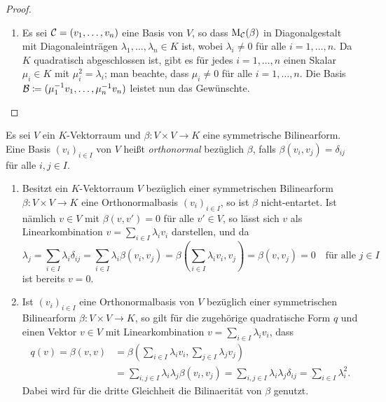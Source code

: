 \documentclass[a4paper,10pt,numbers=noenddot]{scrartcl}
\begin{document}
\begin{proof}
\begin{enumerate}[leftmargin=*]
    \item
      Es sei $\mathcal{C} = (v_1, \dotsc, v_n)$ eine Basis von $V$, so dass $\operatorname{M}_{\mathcal{C}}(\beta)$ in Diagonalgestalt mit Diagonaleinträgen $\lambda_1, \dotsc, \lambda_n \in K$ ist, wobei $\lambda_i \neq 0$ für alle $i = 1, \dotsc, n$.
      Da $K$ quadratisch abgeschlossen ist, gibt es für jedes $i = 1, \dotsc, n$ einen Skalar $\mu_i \in K$ mit $\mu_i^2 = \lambda_i$; man beachte, dass $\mu_i \neq 0$ für alle $i = 1, \dotsc, n$.
      Die Basis $\mathcal{B} \coloneqq (\mu_1^{-1} v_1, \dotsc, \mu_n^{-1} v_n)$ leistet nun das Gewünschte.
    \qedhere
  \end{enumerate}
\end{proof}


\begin{definition}
  Es sei $V$ ein $K$-Vektorraum und $\beta \colon V \times V \to K$ eine symmetrische Bilinearform.
  Eine Basis $(v_i)_{i \in I}$ von $V$ heißt \emph{orthonormal} bezüglich $\beta$, falls $\beta(v_i, v_j) = \delta_{ij}$ für alle $i,j \in I$.
\end{definition}


\begin{remark}
  \begin{enumerate}[leftmargin=*]
    \item
      Besitzt ein $K$-Vektorraum $V$ bezüglich einer symmetrischen Bilinearform $\beta \colon V \times V \to K$ eine Orthonormalbasis $(v_i)_{i \in I}$, so ist $\beta$ nicht-entartet.
      Ist nämlich $v \in V$ mit $\beta(v, v') = 0$ für alle $v' \in V$, so lässt sich $v$ als Linearkombination $v = \sum_{i \in I} \lambda_i v_i$ darstellen, und da
      \[
          \lambda_j
        = \sum_{i \in I} \lambda_i \delta_{ij}
        = \sum_{i \in I} \lambda_i \beta(v_i, v_j)
        = \beta\left( \sum_{i \in I} \lambda_i v_i, v_j \right)
        = \beta(v, v_j)
        = 0
        \quad
        \text{für alle $j \in I$}
      \]
      ist bereits $v = 0$.
    \item
      Ist $(v_i)_{i \in I}$ eine Orthonormalbasis von $V$ bezüglich einer symmetrischen Bilinearform $\beta \colon V \times V \to K$, so gilt für die zugehörige quadratische Form $q$ und einen Vektor $v \in V$ mit Linearkombination $v = \sum_{i \in I} \lambda_i v_i$, dass
      \begin{align*}
            q(v)
         =  \beta(v,v)
        &=  \beta\left( \sum_{i \in I} \lambda_i v_i, \sum_{j \in I} \lambda_j v_j \right)  \\
        &=  \sum_{i,j \in I} \lambda_i \lambda_j \beta(v_i, v_j)
         =  \sum_{i,j \in I} \lambda_i \lambda_j \delta_{ij}
         =  \sum_{i \in I} \lambda_i^2.
      \end{align*}
      Dabei wird für die dritte Gleichheit die Bilinaerität von $\beta$ genutzt.
  \end{enumerate}
\end{remark}
\end{document}
